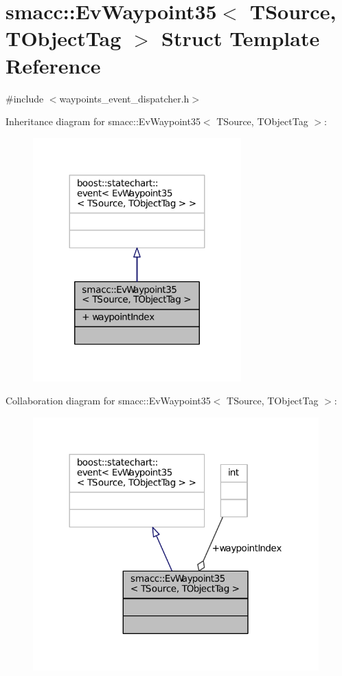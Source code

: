 \hypertarget{structsmacc_1_1EvWaypoint35}{}\section{smacc\+:\+:Ev\+Waypoint35$<$ T\+Source, T\+Object\+Tag $>$ Struct Template Reference}
\label{structsmacc_1_1EvWaypoint35}


{\ttfamily \#include $<$waypoints\+\_\+event\+\_\+dispatcher.\+h$>$}



Inheritance diagram for smacc\+:\+:Ev\+Waypoint35$<$ T\+Source, T\+Object\+Tag $>$\+:
\nopagebreak
\begin{figure}[H]
\begin{center}
\leavevmode
\includegraphics[width=227pt]{structsmacc_1_1EvWaypoint35__inherit__graph}
\end{center}
\end{figure}


Collaboration diagram for smacc\+:\+:Ev\+Waypoint35$<$ T\+Source, T\+Object\+Tag $>$\+:
\nopagebreak
\begin{figure}[H]
\begin{center}
\leavevmode
\includegraphics[width=312pt]{structsmacc_1_1EvWaypoint35__coll__graph}
\end{center}
\end{figure}
